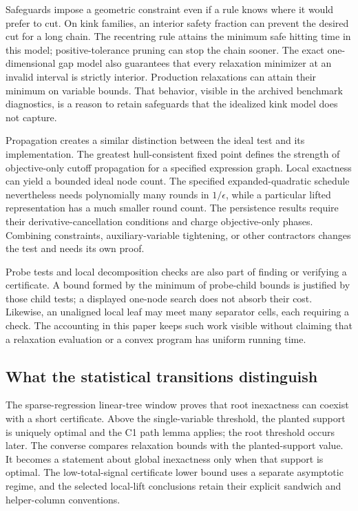 Safeguards impose a geometric constraint even if a rule knows where it
would prefer to cut. On kink families, an interior safety fraction can
prevent the desired cut for a long chain. The recentring rule attains the
minimum safe hitting time in this model; positive-tolerance pruning can
stop the chain sooner. The exact one-dimensional gap model also guarantees
that every relaxation minimizer at an invalid interval is strictly interior.
Production relaxations can attain their minimum on variable bounds. That
behavior, visible in the archived benchmark diagnostics, is a reason to
retain safeguards that the idealized kink model does not capture.

Propagation creates a similar distinction between the ideal test and its
implementation. The greatest hull-consistent fixed point defines the
strength of objective-only cutoff propagation for a specified expression
graph. Local exactness can yield a bounded ideal node count. The specified
expanded-quadratic schedule nevertheless needs polynomially many rounds in
$1/\epsilon$, while a particular lifted representation has a much smaller
round count. The persistence results require their derivative-cancellation
conditions and charge objective-only phases. Combining constraints,
auxiliary-variable tightening, or other contractors changes the test and
needs its own proof.

Probe tests and local decomposition checks are also part of finding or
verifying a certificate. A bound formed by the minimum of probe-child
bounds is justified by those child tests; a displayed one-node search does
not absorb their cost. Likewise, an unaligned local leaf may meet many
separator cells, each requiring a check. The accounting in this paper keeps
such work visible without claiming that a relaxation evaluation or a convex
program has uniform running time.

\subsection{What the statistical transitions distinguish}\label{discussion:statistical}

The sparse-regression linear-tree window proves that root inexactness can
coexist with a short certificate. Above the single-variable threshold, the
planted support is uniquely optimal and the C1 path lemma applies; the root
threshold occurs later. The converse compares relaxation bounds with the
planted-support value. It becomes a statement about global inexactness only
when that support is optimal. The low-total-signal certificate lower bound
uses a separate asymptotic regime, and the selected local-lift conclusions
retain their explicit sandwich and helper-column conventions.

